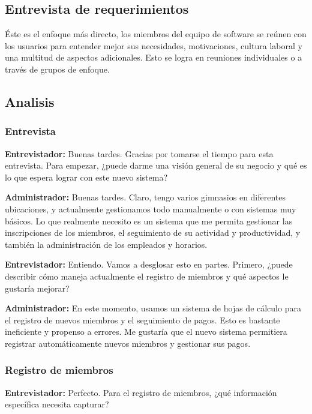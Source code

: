 \documentclass[spanish,12pt]{article}
\begin{document}
\subsection{Entrevista de
requerimientos}\label{entrevista-de-requerimientos}

Éste es el enfoque más directo, los miembros del equipo de software se
reúnen con los usuarios para entender mejor sus necesidades,
motivaciones, cultura laboral y una multitud de aspectos adicionales.
Esto se logra en reuniones individuales o a través de grupos de enfoque.

\subsection{Analisis}\label{analisis}

\subsubsection{Entrevista}\label{entrevista}

\textbf{Entrevistador:} Buenas tardes. Gracias por tomarse el tiempo
para esta entrevista. Para empezar, ¿puede darme una visión general de
su negocio y qué es lo que espera lograr con este nuevo sistema?

\textbf{Administrador:} Buenas tardes. Claro, tengo varios gimnasios en
diferentes ubicaciones, y actualmente gestionamos todo manualmente o con
sistemas muy básicos. Lo que realmente necesito es un sistema que me
permita gestionar las inscripciones de los miembros, el seguimiento de
su actividad y productividad, y también la administración de los
empleados y horarios.

\textbf{Entrevistador:} Entiendo. Vamos a desglosar esto en partes.
Primero, ¿puede describir cómo maneja actualmente el registro de
miembros y qué aspectos le gustaría mejorar?

\textbf{Administrador:} En este momento, usamos un sistema de hojas de
cálculo para el registro de nuevos miembros y el seguimiento de pagos.
Esto es bastante ineficiente y propenso a errores. Me gustaría que el
nuevo sistema permitiera registrar automáticamente nuevos miembros y
gestionar sus pagos.

\subsubsection{Registro de miembros}\label{registro-de-miembros}

\textbf{Entrevistador:} Perfecto. Para el registro de miembros, ¿qué
información específica necesita capturar?
\end{document}
